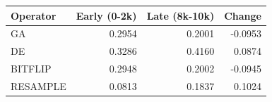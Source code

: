 \begin{tabular}{lrrr}
\toprule
Operator & Early (0-2k) & Late (8k-10k) & Change \\
\midrule
GA & 0.2954 & 0.2001 & -0.0953 \\
DE & 0.3286 & 0.4160 & 0.0874 \\
BITFLIP & 0.2948 & 0.2002 & -0.0945 \\
RESAMPLE & 0.0813 & 0.1837 & 0.1024 \\
\bottomrule
\end{tabular}
